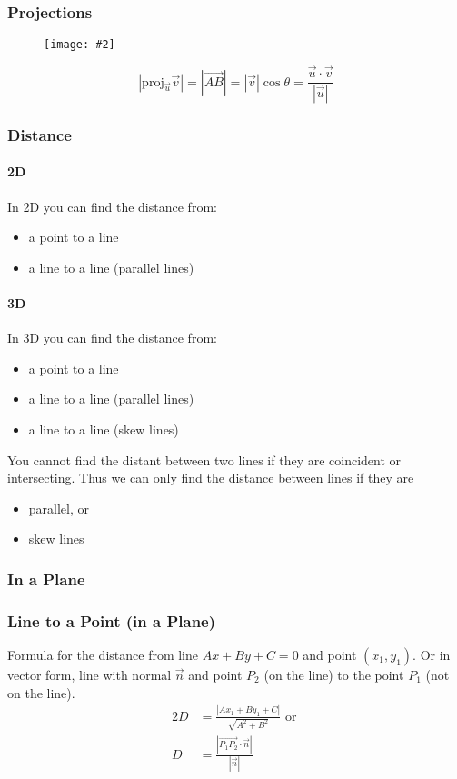 \documentclass[letterpaper, 12pt]{report}
\newcommand{\diagram}[2][0.5]{
	\begin{figure}[H]
		\centering
		\texttt{[image: \#2]}
	\end{figure}
	}
\theoremstyle{definition}
\numberwithin{equation}{section}
\begin{document}
\subsubsection{Projections}
\diagram{projection}
\begin{equation}
	|\mathrm{proj}_{\vec u} \vec v | = |\overrightarrow{AB}| = |\vec v| \cos \theta = \frac{\vec u \cdot \vec v}{|\vec u|}
\end{equation}

\subsubsection{Distance}
\paragraph{2D}
In 2D you can find the distance from:
\begin{itemize}
	\item a point to a line
	\item a line to a line (parallel lines)
\end{itemize}

\paragraph{3D}
In 3D you can find the distance from:
\begin{itemize}
	\item a point to a line
	\item a line to a line (parallel lines)
	\item a line to a line (skew lines)
\end{itemize}

\bigskip \noindent
You cannot find the distant between two lines if they are coincident or intersecting. Thus we can only find the distance between lines if they are
\begin{itemize}
	\item parallel, or
	\item skew lines
\end{itemize}

\subsubsection{In a Plane}
\subsubsection*{Line to a Point (in a Plane)}
Formula for the distance from line $Ax + By + C = 0$ and point $(x_1,y_1)$. Or in vector form, line with normal $\vec n$ and point $P_2$ (on the line) to the point $P_1$ (not on the line).
\begin{alignat}{2}{}
	D &= \frac{|Ax_1+By_1+C|}{\sqrt{A^2+B^2}} \textrm{ or } \\
	D &= \frac{|\overrightarrow{P_1P_2} \cdot \vec n |}{|\vec n|}
\end{alignat}
\end{document}
